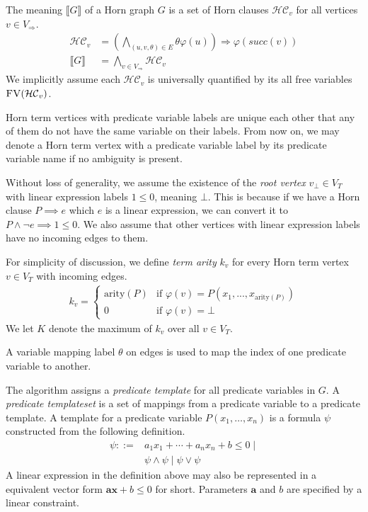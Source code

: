 The meaning $\llbracket G \rrbracket $ of a Horn graph $G$ is a set of
Horn clauses $\mathcal{HC}_v$ for all vertices $v \in V_\Rightarrow$.
\begin{align*}
\mathcal{HC}_v & = \left( \bigwedge_{(u,v,\theta) \in E} \theta \varphi(u) \right) \Longrightarrow \varphi(succ(v)) \\
\llbracket G \rrbracket & = \bigwedge_{v \in V_\Rightarrow} \mathcal{HC}_v
\end{align*}
We implicitly assume each $\mathcal{HC}_v$ is universally quantified
by its all free variables $\textsc{FV}(\mathcal{HC}_v)$.

Horn term vertices with predicate variable labels are unique each
other that any of them do not have the same variable on their labels.
From now on, we may denote a Horn term vertex with a predicate
variable label by its predicate variable name if no ambiguity is
present.

Without loss of generality, we assume the existence of the
\emph{root vertex} $v_\bot \in V_T$ with linear expression labels
$1 \leq 0$, meaning $\bot$.  This is because if we have a Horn clause
$P \implies e$ which $e$ is a linear expression, we can convert it to
$P \wedge \neg e \implies 1 \leq 0$.  We also assume that other
vertices with linear expression labels have no incoming edges to them.

For simplicity of discussion, we define \emph{term arity} $k_v$ for
every Horn term vertex $v \in V_T$ with incoming edges.
\begin{align*}
k_v =
\begin{cases}
\mathrm{arity}(P) & \mbox{if } \varphi(v) = P(x_1,...,x_{\mathrm{arity}(P)}) \\
0 & \mbox{if } \varphi(v) = \bot
\end{cases}
\end{align*}
We let $K$ denote the maximum of $k_v$ over all $v \in V_T$.

A variable mapping label $\theta$ on edges is used to map the index of
one predicate variable to another.

The algorithm assigns a \emph{predicate template} for all predicate
variables in $G$. A \emph{predicate templateset} is a set of mappings
from a predicate variable to a predicate template.  A template for a
predicate variable $P(x_1, \ldots, x_n)$ is a formula $\psi$
constructed from the following definition.
\begin{align*}
\psi ::= & a_1 x_1 + \cdots + a_n x_n + b \leq 0 \mid \\
& \psi \wedge \psi \mid \psi \vee \psi
\end{align*}
A linear expression in the definition above may also be represented in
a equivalent vector form $\mathbf{a} \mathbf{x} + b \leq 0$ for short.
Parameters $\mathbf{a}$ and $b$ are specified by a linear constraint.


